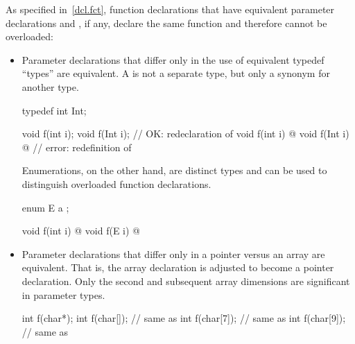 \pnum
{}%
%
\begin{note}
As specified in~\ref{dcl.fct},
function declarations that have equivalent parameter declarations
and , if any,
declare
the same function and therefore cannot
be overloaded:

\begin{itemize}
\item
{}%
Parameter declarations that differ only in the use of equivalent typedef
``types'' are equivalent.
A
is not a separate type, but only a synonym for another type.
\begin{example}
\begin{codeblock}
typedef int Int;

void f(int i);
void f(Int i);                  // OK: redeclaration of 
void f(int i) { @\commentellip@ }
void f(Int i) { @\commentellip@ }     // error: redefinition of 
\end{codeblock}
\end{example}

%
Enumerations, on the other hand, are distinct types and can be used to
distinguish
overloaded function declarations.
\begin{example}
\begin{codeblock}
enum E { a };

void f(int i) { @\commentellip@ }
void f(E i)   { @\commentellip@ }
\end{codeblock}
\end{example}

\item
{}%
%
Parameter declarations that differ only in a pointer
\tcode{*}
versus an array
\tcode{[]}
are equivalent.
That is, the array declaration is adjusted to become a pointer
declaration.
Only the second and subsequent array dimensions are significant in
parameter types.
\begin{example}
\begin{codeblock}
int f(char*);
int f(char[]);                  // same as 
int f(char[7]);                 // same as 
int f(char[9]);                 // same as 


\end{codeblock}
\end{example}
\end{itemize}
\end{note}
